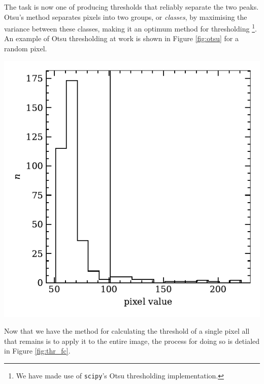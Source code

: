 The task is now one of producing thresholds that reliably separate the two
peaks. Otsu's method \cite{gonzalez2008} separates pixels into two groups, or
\emph{classes}, by maximising the variance between these classes, making it an
optimum method for thresholding \footnote{We have made use of \texttt{scipy}'s
  Otsu thresholding implementation.}. An example of Otsu thresholding at work is
shown in Figure \ref{fig:otsu} for a random pixel.
\begin{center}
    \includegraphics[width=\linewidth]{figures/otsu_bimodal.pdf}
    \label{fig:otsu}
\end{center}
Now that we have the method for calculating the threshold of a single pixel all
that remains is to apply it to the entire image, the process for doing so is
detialed in Figure \ref{fig:thr_fc}.


